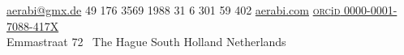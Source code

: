 \documentclass[10pt,a4paper]{article}
\begin{document}
\sloppy  %



\nobreakvspace{0.3em}  %

\noindent\href{mailto:aerabi.at.gmx.dot.de}{aerabi\mbox{}@\mbox{}gmx.de}\sbull
\textsmaller{+}49 176 3569 1988\sbull
\textsmaller{+}31 6 301 59 402\sbull
\href{http://aerabi.com}{aerabi.com}\sbull 
\href{https://orcid.org/0000-0001-7088-417X}{\textsc{orc}i\textsc{d} 0000-0001-7088-417X}
\\
Emmastraat 72 \thinspace\ {\sc The Hague}\sbull
South Holland\sbull
{\sc Netherlands}

\spacedhrule{0.9em}{-0.4em}  %

\end{document}
